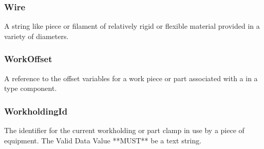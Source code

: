 \subsubsection{Wire}
  \label{sec:Wire}


A string like piece or filament of relatively rigid or flexible material provided in a variety of diameters.

\FloatBarrier

\subsubsection{WorkOffset}
  \label{sec:WorkOffset}


A reference to the offset variables for a work piece or part associated with a  in a  type component.

\FloatBarrier

\subsubsection{WorkholdingId}
  \label{sec:WorkholdingId}


The identifier for the current workholding or part clamp in use by a piece of equipment. 
 The \gls{Valid Data Value} **MUST** be a text string.

\FloatBarrier
